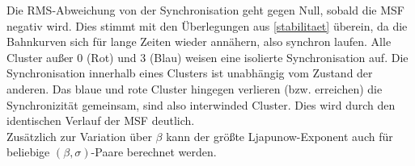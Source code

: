Die RMS-Abweichung von der Synchronisation geht gegen Null, sobald die MSF negativ wird. Dies stimmt mit den Überlegungen aus \ref{stabilitaet} überein, da die Bahnkurven sich für lange Zeiten wieder annähern, also synchron laufen.
Alle Cluster außer 0 (Rot) und 3 (Blau) weisen eine isolierte Synchronisation auf. Die Synchronisation innerhalb eines Clusters ist unabhängig vom Zustand der anderen. Das blaue und rote Cluster hingegen verlieren (bzw. erreichen) die Synchronizität gemeinsam, sind also interwinded Cluster. Dies wird durch den identischen Verlauf der MSF deutlich.\\
Zusätzlich zur Variation über $\beta$ kann der größte Ljapunow-Exponent auch für beliebige $(\beta,\sigma)$-Paare berechnet werden.
\begin{figure}[h]
	\centering
	\\
\end{figure}

